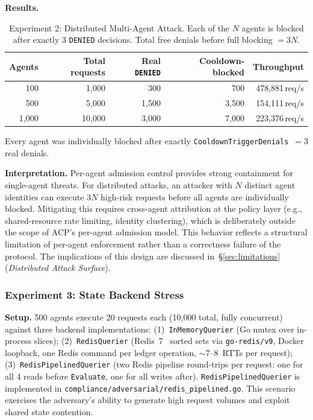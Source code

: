 \documentclass[11pt]{article}
\theoremstyle{definition}
\begin{document}
\textbf{Results.}
\begin{table}[h!]
\centering\small
\begin{tabular}{rrrrr}
\toprule
Agents & Total requests & Real \texttt{DENIED} & Cooldown-blocked & Throughput \\
\midrule
100     &  1{,}000 &    300 &    700 & 478{,}881\,req/s \\
500     &  5{,}000 &  1{,}500 &  3{,}500 & 154{,}111\,req/s \\
1{,}000 & 10{,}000 &  3{,}000 &  7{,}000 & 223{,}376\,req/s \\
\bottomrule
\end{tabular}
\caption{Experiment 2: Distributed Multi-Agent Attack. Each of the $N$ agents
is blocked after exactly 3 \texttt{DENIED} decisions.
Total free denials before full blocking $= 3N$.}
\label{tab:adv-exp2}
\end{table}

Every agent was individually blocked after exactly
\texttt{CooldownTriggerDenials}~$=3$ real denials.

\textbf{Interpretation.}
Per-agent admission control provides strong containment for single-agent threats.
For distributed attacks, an attacker with $N$ distinct agent identities can
execute $3N$ high-risk requests before all agents are individually blocked.
Mitigating this requires cross-agent attribution at the policy layer
(e.g., shared-resource rate limiting, identity clustering), which is
deliberately outside the scope of ACP's per-agent admission model.
This behavior reflects a structural limitation of per-agent enforcement rather than a
correctness failure of the protocol. The implications of this design are discussed
in~\S\ref{sec:limitations} (\emph{Distributed Attack Surface}).

\subsubsection*{Experiment 3: State Backend Stress}

\textbf{Setup.}
500 agents execute 20 requests each (10{,}000 total, fully concurrent) against
three backend implementations:
(1)~\texttt{InMemoryQuerier} (Go mutex over in-process slices);
(2)~\texttt{RedisQuerier} (Redis~7~\cite{redis} sorted sets via \texttt{go-redis/v9},
Docker loopback, one Redis command per ledger operation,
$\sim$7--8~RTTs per request);
(3)~\texttt{RedisPipelinedQuerier} (two Redis pipeline round-trips per request:
one for all 4 reads before \texttt{Evaluate}, one for all writes after).
\texttt{RedisPipelinedQuerier} is implemented in
\texttt{compliance/adversarial/redis\_pipelined.go}.
This scenario exercises the adversary's ability to generate high request volumes
and exploit shared state contention.
\end{document}

